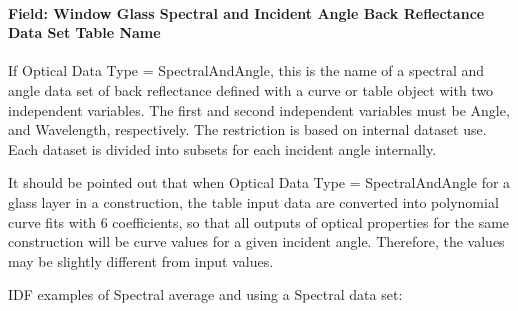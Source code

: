 \paragraph{Field: Window Glass Spectral and Incident Angle Back Reflectance Data Set Table Name}\label{field-window-glass-spectral-and-incident-angle-back-reflectance-data}

If Optical Data Type = SpectralAndAngle, this is the name of a spectral and angle data set of back reflectance defined with a curve or table object with two independent variables. The first and second independent variables must be Angle, and Wavelength, respectively. The restriction is based on internal dataset use. Each dataset is divided into subsets for each incident angle internally.

It should be pointed out that when Optical Data Type = SpectralAndAngle for a glass layer in a construction, the table input data are converted into polynomial curve fits with 6 coefficients, so that all outputs of optical properties for the same construction will be curve values for a given incident angle. Therefore, the values may be slightly different from input values.

IDF examples of Spectral average and using a Spectral data set:

